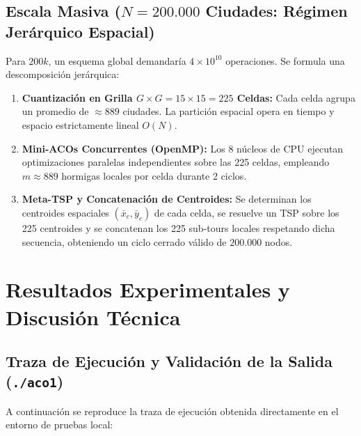 \documentclass[11pt,a4paper]{article}
\begin{document}
\subsection{Escala Masiva (\texorpdfstring{$N = 200.000$}{N = 200000} Ciudades: Régimen Jerárquico Espacial)}
Para $200k$, un esquema global demandaría $4 \times 10^{10}$ operaciones. Se formula una descomposición jerárquica:
\begin{enumerate}
    \item \textbf{Cuantización en Grilla $G \times G = 15 \times 15 = 225$ Celdas:} Cada celda agrupa un promedio de $\approx 889$ ciudades. La partición espacial opera en tiempo y espacio estrictamente lineal $O(N)$.
    \item \textbf{Mini-ACOs Concurrentes (OpenMP):} Los 8 núcleos de CPU ejecutan optimizaciones paralelas independientes sobre las 225 celdas, empleando $m \approx 889$ hormigas locales por celda durante 2 ciclos.
    \item \textbf{Meta-TSP y Concatenación de Centroides:} Se determinan los centroides espaciales $(\bar{x}_c, \bar{y}_c)$ de cada celda, se resuelve un TSP sobre los 225 centroides y se concatenan los 225 sub-tours locales respetando dicha secuencia, obteniendo un ciclo cerrado válido de $200.000$ nodos.
\end{enumerate}

\section{Resultados Experimentales y Discusión Técnica}

\subsection{Traza de Ejecución y Validación de la Salida (\texttt{./aco1})}
A continuación se reproduce la traza de ejecución obtenida directamente en el entorno de pruebas local:
\end{document}
